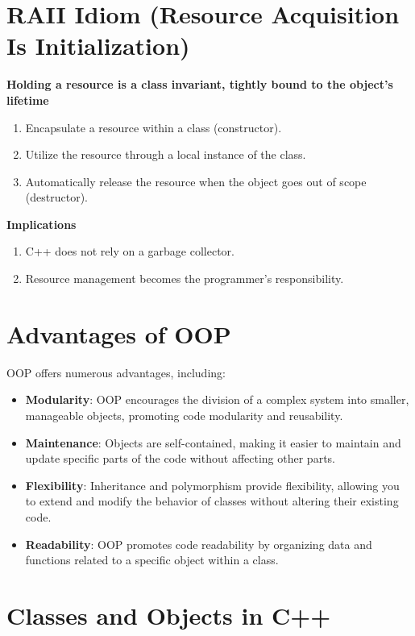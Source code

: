 \section{RAII Idiom (Resource Acquisition Is Initialization)}

\textbf{Holding a resource is a class invariant, tightly bound to the object's lifetime}

\begin{enumerate}
    \item Encapsulate a resource within a class (constructor).
    \item Utilize the resource through a local instance of the class.
    \item Automatically release the resource when the object goes out of scope (destructor).
\end{enumerate}

\textbf{Implications}

\begin{enumerate}
    \item C++ does not rely on a garbage collector.
    \item Resource management becomes the programmer's responsibility.
\end{enumerate}

\section{Advantages of OOP}

OOP offers numerous advantages, including:

\begin{itemize}
    \item \textbf{Modularity}: OOP encourages the division of a complex system into smaller, manageable objects, promoting code modularity and reusability.
    \item \textbf{Maintenance}: Objects are self-contained, making it easier to maintain and update specific parts of the code without affecting other parts.
    \item \textbf{Flexibility}: Inheritance and polymorphism provide flexibility, allowing you to extend and modify the behavior of classes without altering their existing code.
    \item \textbf{Readability}: OOP promotes code readability by organizing data and functions related to a specific object within a class.
\end{itemize}

\section{Classes and Objects in C++}

